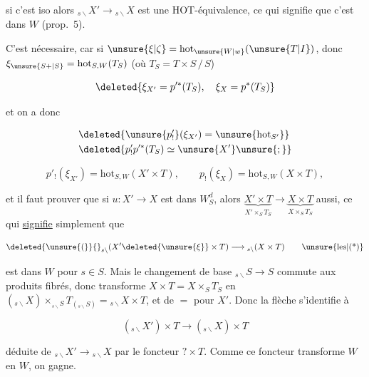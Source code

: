 si c'est iso  alors $ {}_{s\backslash}X'\longrightarrow{}_{s\backslash}X$ est  une $\mathrm{HOT}$-équivalence, ce qui signifie que c'est dans $W$ (prop.~5).


C'est nécessaire, car  si $\unsure{\xi|\zeta}=\mathrm{hot}_{\unsure{W|w}}(\unsure{T|I})$,  donc $\xi_{\unsure{S+|S}}=\mathrm{hot}_{S,W}(T_S)$ (où $T_S=T\times S\,/\,S$)


\[
 \deleted{\xi_{X'}=p'^*(T_S),\quad \xi_X=p^*(T_S)}
\]

et on a donc

\[
\begin{aligned}
 &\deleted{\unsure{p'_!}(\xi_{X'})=\unsure{\mathrm{hot}_{S'}}}\\
 &\deleted{p'_!p'^*(T_S)\simeq\unsure{X'}\unsure{;}}
\end{aligned}
\]

\[
 p'_!(\xi_{X'})=\mathrm{hot}_{S,W}(X'\times T),\qquad
 p_!(\xi_X)=\mathrm{hot}_{S,W}(X\times T),
\]

et il faut prouver que si $u:X'\longrightarrow X$ est dans $W_S^d$, alors $\underbrace{X'\times T}_{X'\times_S T_S}\longrightarrow\underbrace{X\times T}_{X\times_S T_S}$ aussi, ce qui \uline{signifie} simplement que 

\[
 \deleted{\unsure{(}}{}_{s\backslash}(X'\deleted{\unsure{\xi}}\times T)\longrightarrow{}_{s\backslash}(X\times T)\tag*{\unsure{les|(*)}}
\]

est dans $W$ pour  $s\in S$. Mais le changement de base $ {}_{s\backslash}S\longrightarrow S$ commute aux produits fibrés, donc transforme $X\times T=X\times_S T_S$ en $({}_{s\backslash}X)\times_{{}_{s\backslash}S}T_{({}_{s\backslash}S)}={}_{s\backslash}X\times T$, et de $=$ pour $X'$. Donc la flèche s'identifie à

\[
 ({}_{s\backslash}X')\times T\longrightarrow({}_{s\backslash}X)\times T
\]

déduite de $ {}_{s\backslash}X'\longrightarrow{}_{s\backslash}X$ par  le foncteur $?\times T$. Comme ce foncteur transforme $W$ en $W$, on gagne. 

